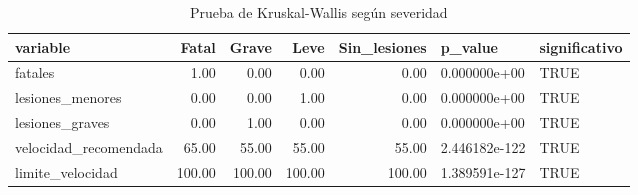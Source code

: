 \begin{table}[ht]
\centering
\caption{Prueba de Kruskal-Wallis según severidad} 
\begin{tabular}{lrrrrll}
  \hline
variable & Fatal & Grave & Leve & Sin\_lesiones & p\_value & significativo \\ 
  \hline
fatales & 1.00 & 0.00 & 0.00 & 0.00 &  0.000000e+00 & TRUE \\ 
  lesiones\_menores & 0.00 & 0.00 & 1.00 & 0.00 &  0.000000e+00 & TRUE \\ 
  lesiones\_graves & 0.00 & 1.00 & 0.00 & 0.00 &  0.000000e+00 & TRUE \\ 
  velocidad\_recomendada & 65.00 & 55.00 & 55.00 & 55.00 & 2.446182e-122 & TRUE \\ 
  limite\_velocidad & 100.00 & 100.00 & 100.00 & 100.00 & 1.389591e-127 & TRUE \\ 
   \hline
\end{tabular}
\end{table}
